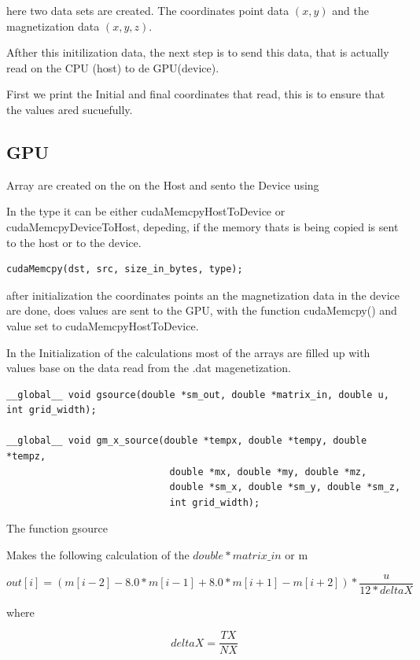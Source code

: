 here two data sets are created. The coordinates point data $(x,y)$ and the magnetization data $(x, y, z)$.

Afther this initilization data, the next step is to send this data, that is actually read on the CPU (host) to de GPU(device).


First we print the Initial and final coordinates that read, this is to ensure that the values ared sucuefully.


\subsection{GPU}


Array are created on the on the Host and sento the Device using

In the type it can be either cudaMemcpyHostToDevice or cudaMemcpyDeviceToHost, depeding, if the memory thats is being copied is sent to the host or to the device.

\begin{lstlisting}[frame=none]
cudaMemcpy(dst, src, size_in_bytes, type);
\end{lstlisting}

after initialization the coordinates points an the magnetization data in the device are done, does values are sent to the GPU, with the function cudaMemcpy() and value set to cudaMemcpyHostToDevice.

In the Initialization of the calculations most of the arrays are filled up with values base on the data read from the .dat magenetization.

\begin{lstlisting}[frame=none]
__global__ void gsource(double *sm_out, double *matrix_in, double u, int grid_width);

__global__ void gm_x_source(double *tempx, double *tempy, double *tempz,
							 double *mx, double *my, double *mz,
							 double *sm_x, double *sm_y, double *sm_z,
							 int grid_width);
\end{lstlisting}


The function gsource

Makes the following calculation of the $double *matrix\_in$ or m


\begin{equation} \label{eq:gsource}
out[i] = (m[i-2] - 8.0*m[i-1] + 8.0*m[i+1] - m[i+2]) * \dfrac{u}{12 * deltaX }
\end{equation}

where

$$deltaX = \frac{TX}{NX}$$

